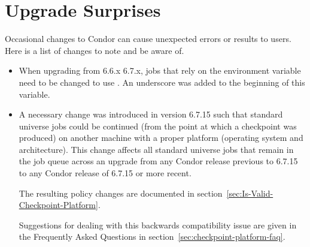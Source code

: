 \section{\label{sec:gotchas}Upgrade Surprises}

Occasional changes to Condor can cause unexpected errors or results
to users.
Here is a list of changes to note and be aware of.

\begin{itemize}

\item When upgrading from 6.6.x 6.7.x,
  jobs that rely on the environment variable 
  need to be changed to use .
  An underscore was added to the beginning of this variable.

\item A necessary change was introduced in version 6.7.15 such that
  standard universe jobs could be continued (from the point at which
  a checkpoint was produced) on another machine with a proper
  platform (operating system and architecture). This change affects
  all standard universe jobs that remain in the job queue across
  an upgrade from any Condor release previous to 6.7.15 to any
  Condor release of 6.7.15 or more recent.

  The resulting policy changes are documented in
  section~\ref{sec:Is-Valid-Checkpoint-Platform}.

  Suggestions for dealing with this backwards compatibility issue
  are given in the Frequently Asked Questions in
  section~\ref{sec:checkpoint-platform-faq}.


\end{itemize}

